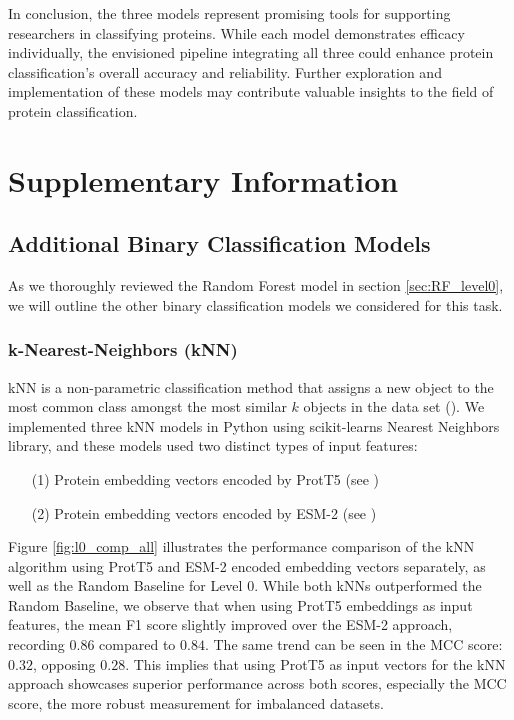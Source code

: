 \documentclass{bioinfo}
\begin{document}
In conclusion, the three models represent promising tools for supporting researchers in classifying proteins. 
While each model demonstrates efficacy individually, the envisioned pipeline integrating all three could enhance protein classification's overall accuracy and reliability.
Further exploration and implementation of these models may contribute valuable insights to the field of protein classification.

\section{Supplementary Information}

\subsection{Additional Binary Classification Models}\label{sec:unused binarys}
As we thoroughly reviewed the Random Forest model in section \ref{sec:RF_level0}, we will outline the other binary classification models we considered for this task.

\subsubsection{k-Nearest-Neighbors (kNN)}
kNN is a non-parametric classification method
that assigns a new object to the most common class amongst the most similar $k$ objects in the data set (\cite{knn_principles}). 
We implemented three kNN models in Python using scikit-learns Nearest Neighbors library, and 
these models used two distinct types of input features:
\begin{enumerate}
	\item[(1)] Protein embedding vectors encoded by ProtT5 (see \cite{ProtT5})
    \item[(2)] Protein embedding vectors encoded by ESM-2 (see \cite{ESM2})
\end{enumerate}
Figure \ref{fig:l0_comp_all} illustrates the performance comparison of the kNN algorithm using ProtT5 and ESM-2 encoded
embedding vectors separately, as well as the Random Baseline for Level $0$.
While both kNNs outperformed the Random Baseline, we observe that when using ProtT5 embeddings as input features, 
the mean F1 score slightly improved over the ESM-2 approach, recording $0.86$ compared to $0.84$.
The same trend can be seen in the MCC score: $0.32$, opposing $0.28$. 
This implies that using ProtT5 as input vectors for the kNN approach showcases superior performance across both scores, 
especially the MCC score, the more robust measurement for imbalanced datasets. 
\end{document}
